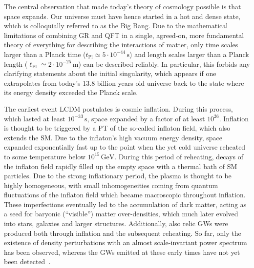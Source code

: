 The central observation that made today's theory of cosmology possible is that space expands. Our universe must have hence started in a hot and dense state, which is colloquially referred to as  the Big Bang. Due to the mathematical limitations of combining \ac{GR} and \ac{QFT} in a single, agreed-on, more fundamental theory of everything for describing the interactions of matter, only time scales larger than a Planck time ($t_\text{Pl} \simeq 5 \cdot 10^{-44} \, \text{s}$) and length scales larger than a Planck length ($\ell_\text{Pl} \simeq 2 \cdot 10^{-25} \, \text{m}$) can be described reliably. In particular, this forbids any clarifying statements about the initial singularity, which appears if one extrapolates from today's 13.8 billion years old universe back to the state where its energy density exceeded the Planck scale.

The earliest event \ac{LCDM} postulates is cosmic inflation. During this process, which lasted at least $10^{-33} \, \text{s}$, space expanded by a factor of at least $10^{26}$. Inflation  is thought to be triggered by a \ac{PT} of the so-called inflaton field, which also extends the \ac{SM}. Due to the inflaton's high vacuum energy density, space expanded exponentially fast up to the point when the yet cold universe reheated to some temperature below $10^{15} \, \text{GeV}$. During this period of reheating, decays of the inflaton field rapidly filled up the empty space with a thermal bath of SM particles. Due to the strong inflationary period, the plasma is thought to be highly homogeneous, with small inhomogeneities coming from quantum fluctuations of the inflaton field which became macroscopic throughout inflation. These imperfections eventually led to the accumulation of dark matter, acting as a seed for baryonic (``visible'') matter over-densities, which much later evolved into stars, galaxies and larger structures. Additionally, also relic \acp{GW} were produced both through inflation and the subsequent reheating. So far, only the existence of density perturbations with an almost scale-invariant power spectrum has been observed, whereas the \acp{GW} emitted at these early times have not yet been detected~\cite{Planck:2018vyg}.


